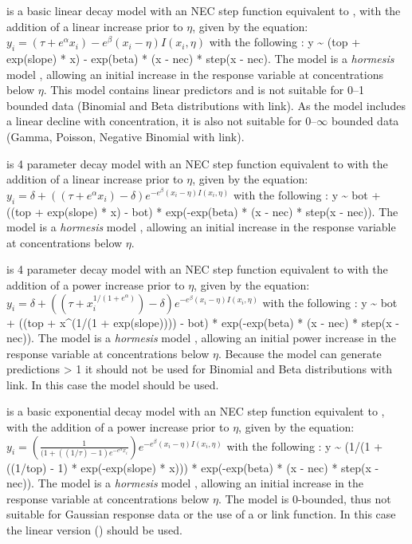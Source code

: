 \documentclass[
  shortnames]{jss}
\begin{document}
 is a basic linear decay model with an NEC step function equivalent to , with the addition of a linear increase prior to \(\eta\), given by the equation:
\(y_i = (\tau + e^{\alpha} x_i) - e^{\beta} \left(x_i - \eta \right) I(x_i, \eta)\)
with the following : y \textasciitilde{} (top + exp(slope) * x) - exp(beta) * (x - nec) * step(x - nec). The  model is a \emph{hormesis} model \citep{Mattson2008}, allowing an initial increase in the response variable at concentrations below \(\eta\). This model contains linear predictors and is not suitable for 0--1 bounded data (Binomial and Beta distributions with  link). As the model includes a linear decline with concentration, it is also not suitable for 0--\(\infty\) bounded data (Gamma, Poisson, Negative Binomial with  link).

 is 4 parameter decay model with an NEC step function equivalent to  with the addition of a linear increase prior to \(\eta\), given by the equation:
\(y_i = \delta + ((\tau + e^{\alpha} x_i) - \delta ) e^{-e^{\beta} \left(x_i - \eta \right) I(x_i, \eta)}\)
with the following : y \textasciitilde{} bot + ((top + exp(slope) * x) - bot) * exp(-exp(beta) * (x - nec) * step(x - nec)). The  model is a \emph{hormesis} model \citep{Mattson2008}, allowing an initial increase in the response variable at concentrations below \(\eta\).

 is 4 parameter decay model with an NEC step function equivalent to  with the addition of a power increase prior to \(\eta\), given by the equation:
\(y_i = \delta + ((\tau + x_i^{1/(1+e^{\alpha})}) - \delta) e^{-e^{\beta} \left(x_i - \eta \right) I(x_i, \eta)}\)
with the following : y \textasciitilde{} bot + ((top + x\^{}(1/(1 + exp(slope)))) - bot) * exp(-exp(beta) * (x - nec) * step(x - nec)). The  model is a \emph{hormesis} model \citep{Mattson2008}, allowing an initial power increase in the response variable at concentrations below \(\eta\). Because the model can generate predictions \textgreater{} 1 it should not be used for Binomial and Beta distributions with  link. In this case the  model should be used.

 is a basic exponential decay model with an NEC step function equivalent to , with the addition of a power increase prior to \(\eta\), given by the equation:
\(y_i = \left(\frac{1}{(1 + ((1/\tau)-1) e^{-e^{\alpha}x_i}}\right) e^{-e^{\beta} \left(x_i - \eta \right) I(x_i, \eta)}\)
with the following : y \textasciitilde{} (1/(1 + ((1/top) - 1) * exp(-exp(slope) * x))) * exp(-exp(beta) * (x - nec) * step(x - nec)). The  model is a \emph{hormesis} model \citep{Mattson2008}, allowing an initial increase in the response variable at concentrations below \(\eta\). The model is 0-bounded, thus not suitable for Gaussian response data or the use of a  or  link function. In this case the linear version () should be used.
\end{document}
